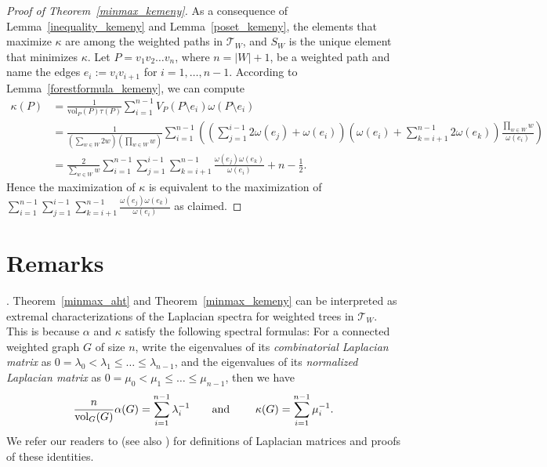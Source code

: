 \documentclass[11pt]{article}
\theoremstyle{definition}
\newcommand{\vol}{\text{vol}}
\begin{document}
\begin{proof}[Proof of Theorem~\ref{minmax_kemeny}]
As a consequence of Lemma~\ref{inequality_kemeny} and Lemma~\ref{poset_kemeny}, the elements that maximize $\kappa$ are among the weighted paths in $\mathcal{T}_W$, and $S_W$ is the unique element that minimizes $\kappa$. Let $P=v_1v_2\dots v_n$, where $n=|W|+1$, be a weighted path and name the edges $e_i:=v_iv_{i+1}$ for $i=1,\dots,n-1$.
According to Lemma~\ref{forestformula_kemeny}, we can compute\begin{align*}
    \kappa(P)&=\frac{1}{\vol_P(P)\tau(P)}\sum_{i=1}^{n-1} V_P(P\setminus e_i)\omega(P\setminus e_i)\\
    &=\frac{1}{(\sum_{w\in W} 2w)(\prod_{w\in W} w)}\sum_{i=1}^{n-1}\left( (\sum_{j=1}^{i-1}2\omega(e_j)+\omega(e_i))(\omega(e_i)+\sum_{k=i+1}^{n-1}2\omega(e_k))\frac{\prod_{w\in W} w}{\omega(e_i)}\right)\\
    &=\frac{2}{\sum_{w\in W} w}\sum_{i=1}^{n-1}\sum_{j=1}^{i-1}\sum_{k=i+1}^{n-1}\frac{\omega(e_j)\omega(e_k)}{\omega(e_i)}+n-\frac{1}{2}.
\end{align*}Hence the maximization of $\kappa$ is equivalent to the maximization of $\sum_{i=1}^{n-1}\sum_{j=1}^{i-1}\sum_{k=i+1}^{n-1}\frac{\omega(e_j)\omega(e_k)}{\omega(e_i)}$ as claimed.
\end{proof}

\section{Remarks}\label{section_remark}

. Theorem~\ref{minmax_aht} and Theorem~\ref{minmax_kemeny} can be interpreted as extremal characterizations of the Laplacian spectra for weighted trees in $\mathcal{T}_W$. This is because $\alpha$ and $\kappa$ satisfy the following spectral formulas: For a connected weighted graph $G$ of size $n$, write the eigenvalues of its \emph{combinatorial Laplacian matrix} as $0=\lambda_0<\lambda_1\leq \dots\leq \lambda_{n-1}$, and the eigenvalues of its \emph{normalized Laplacian matrix} as $0=\mu_0<\mu_1\leq \dots\leq \mu_{n-1}$, then we have
   \[\frac{n}{\vol_G(G)}\alpha(G)=\sum_{i=1}^{n-1} \lambda_i^{-1}\text{\qquad and \qquad} \kappa(G)=\sum_{i=1}^{n-1} \mu_i^{-1}.\]
We refer our readers to \cite{chung2021forest} (see also \cite{chebotarev2007graph,chebotarev2020hitting,levene2002kemeny}) for definitions of Laplacian matrices and proofs of these identities.
\end{document}
